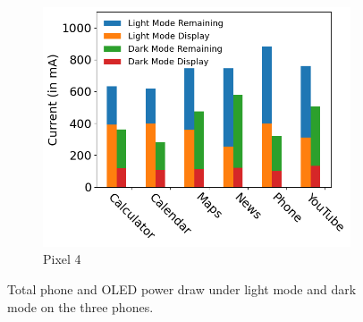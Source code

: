 \begin{figure}[tb]
\begin{subfigure}[]{0.32\textwidth}
		\includegraphics[width=\textwidth]{figure/004_Pixel4_case_study.png}
        \vspace{-0.2in}
		\caption{Pixel 4}
	\end{subfigure}
        \vspace{-0.15in}
	\caption{Total phone and OLED power draw under light mode and dark mode
 on the three phones. }
        \vspace{-0.10in}
	\label{fig:apps_expriment}
\end{figure}

